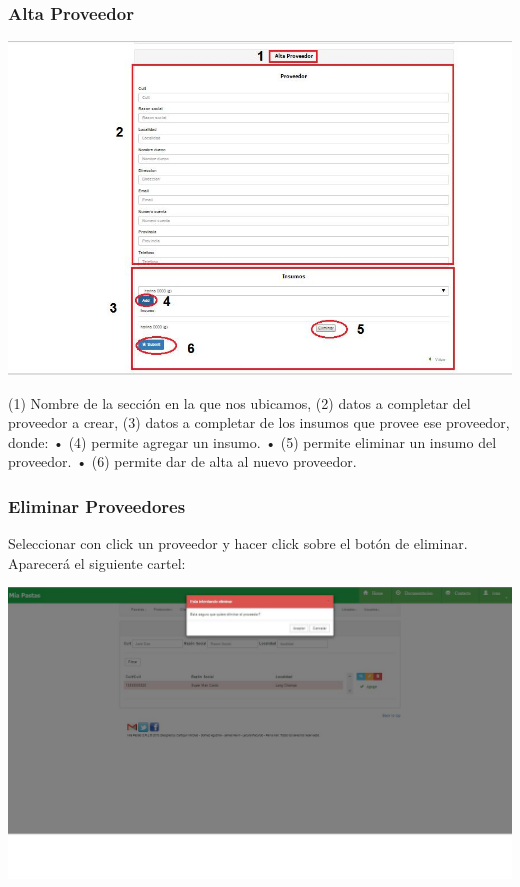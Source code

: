 \documentclass[letterpaper,10pt,english]{sphinxmanual}
\begin{document}
\subsubsection{Alta Proveedor}
\label{proveedores:alta-proveedor}
\includegraphics{proveedor_alta.jpg}

(1) Nombre de la sección en la que nos ubicamos, (2) datos a completar del proveedor a crear, (3) datos a completar de los insumos que provee ese proveedor, donde:
•       (4) permite agregar un insumo.
•       (5) permite eliminar un insumo del proveedor.
•       (6) permite dar de alta al nuevo proveedor.


\subsubsection{Eliminar Proveedores}
\label{proveedores:eliminar-proveedores}
Seleccionar con click un proveedor y hacer click sobre el botón de eliminar. Aparecerá el siguiente cartel:

\includegraphics{proveedor_eliminar.jpg}
\end{document}
